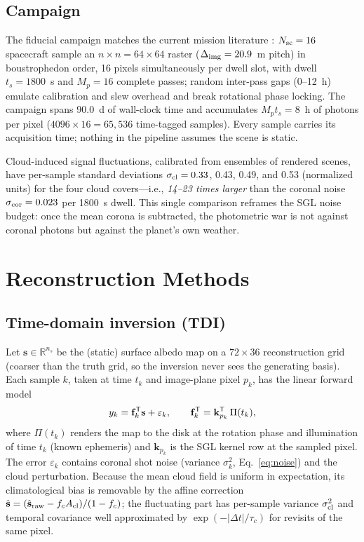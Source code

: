 ﻿\documentclass[twocolumn,10pt]{article}
\begin{document}
\subsection{Campaign}
The fiducial campaign matches the current mission literature
\citep{tt22mnras,helvajian23,tur26bench}: $N_{\rm sc}=16$ spacecraft
sample an $n\times n=64\times64$ raster ($\Delta_{\rm img}=20.9$~m
pitch) in boustrophedon order, 16 pixels simultaneously per dwell slot,
with dwell $t_s=1800$~s and $M_p=16$ complete passes; random
inter-pass gaps (0--12~h) emulate calibration and slew overhead and
break rotational phase locking. The campaign spans 90.0~d of wall-clock
time and accumulates $M_p t_s=8$~h of photons per pixel
($4096\times16=65{,}536$ time-tagged samples). Every sample carries its
acquisition time; nothing in the pipeline assumes the scene is static.

Cloud-induced signal fluctuations, calibrated from ensembles of rendered
scenes, have per-sample standard deviations
$\sigma_{\rm cl}=0.33$, 0.43, 0.49, and 0.53 (normalized units) for the
four cloud covers---i.e., {\it 14--23 times larger} than the coronal
noise $\sigma_{\rm cor}=0.023$ per 1800~s dwell. This single comparison
reframes the SGL noise budget: once the mean corona is subtracted,
the photometric war is not against coronal photons but against the
planet's own weather.

\section{Reconstruction Methods}
\label{sec:methods}

\subsection{Time-domain inversion (TDI)}
Let $\mathbf{s}\in\mathbb{R}^{n_s}$ be the (static) surface albedo map on
a $72\times36$ reconstruction grid (coarser than the truth grid, so the
inversion never sees the generating basis). Each sample $k$, taken at
time $t_k$ and image-plane pixel $p_k$, has the linear forward model
\begin{equation}
y_k=\mathbf{f}_k^{\sf T}\mathbf{s}+\varepsilon_k,\qquad
\mathbf{f}_k^{\sf T}=\mathbf{k}_{p_k}^{\sf T}\,\Pi(t_k),
\label{eq:forward}
\end{equation}
where $\Pi(t_k)$ renders the map to the disk at the rotation phase and
illumination of time $t_k$ (known ephemeris) and
$\mathbf{k}_{p_k}$ is the SGL kernel row at the sampled pixel. The error
$\varepsilon_k$ contains coronal shot noise (variance $\sigma_k^2$,
Eq.~\ref{eq:noise}) and the cloud perturbation. Because the mean cloud
field is uniform in expectation, its climatological bias is removable by
the affine correction
$\hat{\mathbf{s}}=(\hat{\mathbf{s}}_{\rm raw}-f_cA_{\rm cl})/(1-f_c)$;
the fluctuating part has per-sample variance $\sigma_{\rm cl}^2$ and
temporal covariance well approximated by
$\exp(-|\Delta t|/\tau_c)$ for revisits of the same pixel.
\end{document}
